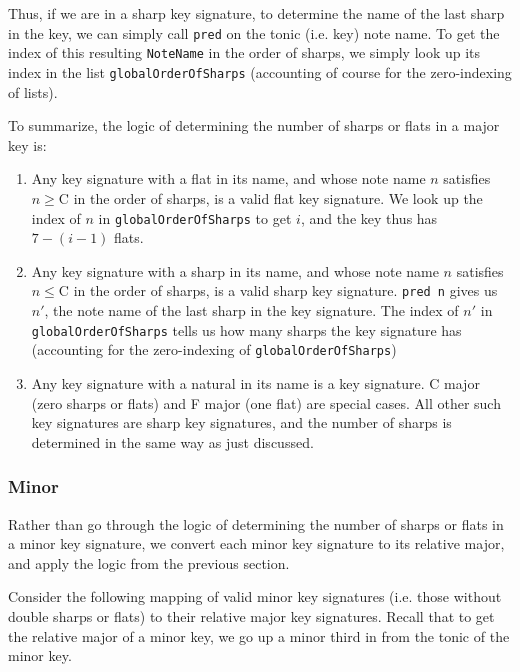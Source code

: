 \documentclass{report}
\begin{document}
Thus, if we are in a sharp key signature, to determine the name of the last sharp in the key, we can simply call \verb.pred. on the tonic (i.e. key) note name. To get the index of this resulting \verb.NoteName. in the order of sharps, we simply look up its index in the list \verb.globalOrderOfSharps. (accounting of course for the zero-indexing of lists).

To summarize, the logic of determining the number of sharps or flats in a major key is:
\begin{enumerate}
\item Any key  signature with a flat in its name, and whose note name $n$ satisfies $n \geq $\;C in the order of sharps, is a valid flat key signature. We look up the index of $n$ in \verb.globalOrderOfSharps. to get $i$, and the key thus has $7-(i-1)$ flats.
\item Any key  signature with a sharp in its name, and whose note name $n$ satisfies $n \leq $\;C in the order of sharps, is a valid sharp key signature. \verb.pred n. gives us $n'$, the note name of the last sharp in the key signature. The index of $n'$ in \verb.globalOrderOfSharps. tells us how many sharps the key signature has (accounting for the zero-indexing of \verb.globalOrderOfSharps.)

\item Any key  signature with a natural in its name is a key signature. C major (zero sharps or flats) and F major (one flat) are special cases. All other such key signatures are sharp key signatures, and the number of sharps is determined in the same way as just discussed.
\end{enumerate}

\subsubsection{Minor}
Rather than go through the logic of determining the number of sharps or flats in a minor key signature, we convert each minor key signature to its relative major, and apply the logic from the previous section.

Consider the following mapping of valid minor key signatures (i.e. those without double sharps or flats) to their relative major key signatures. Recall that to get the relative major of a minor key, we go up a minor third in from the tonic of the minor key. 
\end{document}
